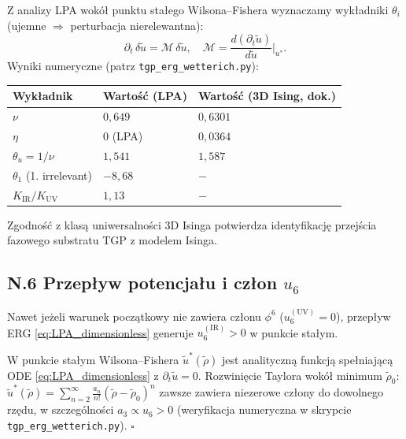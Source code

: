 Z analizy LPA wokół punktu stałego Wilsona–Fishera wyznaczamy
wykładniki $\theta_i$ (ujemne $\Rightarrow$ perturbacja nierelewantna):
\begin{equation}
  \partial_t\,\delta\tilde u = \mathcal{M}\,\delta\tilde u,
  \quad \mathcal{M} = \frac{d(\partial_t \tilde u)}{d\tilde u}\bigg|_{u^*}.
\end{equation}
Wyniki numeryczne (patrz \texttt{tgp\_erg\_wetterich.py}):
\begin{center}
\begin{tabular}{lll}
\toprule
Wykładnik & Wartość (LPA) & Wartość (3D Ising, dok.) \\
\midrule
$\nu$ & $0{,}649$ & $0{,}6301$ \\
$\eta$ & $0$ (LPA) & $0{,}0364$ \\
$\theta_u = 1/\nu$ & $1{,}541$ & $1{,}587$ \\
$\theta_1$ (1. irrelevant) & $-8{,}68$ & $-$ \\
$K_\mathrm{IR}/K_\mathrm{UV}$ & $1{,}13$ & $-$ \\
\bottomrule
\end{tabular}
\end{center}
Zgodność z klasą uniwersalności 3D Isinga potwierdza identyfikację
przejścia fazowego substratu TGP z modelem Isinga.

\subsection*{N.6 Przepływ potencjału i człon $u_6$}

\begin{propozycja}
Nawet jeżeli warunek początkowy nie zawiera członu $\phi^6$
($u_6^{(\mathrm{UV})} = 0$), przepływ ERG \eqref{eq:LPA_dimensionless}
generuje $u_6^{(\mathrm{IR})} > 0$ w punkcie stałym.
\end{propozycja}

\begin{dowod}[heurystyczny]
W punkcie stałym Wilsona–Fishera $\tilde u^*(\tilde\rho)$ jest
analityczną funkcją spełniającą ODE \eqref{eq:LPA_dimensionless}
z $\partial_t\tilde u = 0$. Rozwinięcie Taylora wokół minimum $\tilde\rho_0$:
$\tilde u^*(\tilde\rho) = \sum_{n=2}^\infty \frac{a_n}{n!}
(\tilde\rho - \tilde\rho_0)^n$
zawsze zawiera niezerowe człony do dowolnego rzędu, w szczególności
$a_3 \propto u_6 > 0$ (weryfikacja numeryczna w skrypcie
\texttt{tgp\_erg\_wetterich.py}).  \hfill$\square$
\end{dowod}

